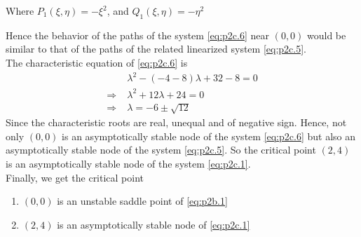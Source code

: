 \documentclass[../main-sheet.tex]{subfiles}
\begin{document}
\begin{soln}[c]
\begin{enumerate}[label=(\roman*)]
        Where \(P_1(\xi,\eta)=-\xi^2\), and \(Q_1(\xi,\eta)=-\eta^2\)
    \end{enumerate}
    Hence the behavior of the paths of the system \eqref{eq:p2c.6} near \((0,0)\) would be similar to that of the paths of the related linearized system \eqref{eq:p2c.5}.\\
    The characteristic equation of \eqref{eq:p2c.6} is
    \begin{align*}
        &\lambda^2-(-4-8)\lambda+32-8=0\\
        \Rightarrow\;&\lambda^2+12\lambda+24=0\\
        \Rightarrow\;&\lambda=-6\pm\sqrt{12}
    \end{align*}
    Since the characteristic roots are real, unequal and of negative sign. Hence, not only \((0,0)\) is an asymptotically stable node of the system \eqref{eq:p2c.6} but also an asymptotically stable node of the system \eqref{eq:p2c.5}. So the critical
    point \((2,4)\) is an asymptotically stable node of the system \eqref{eq:p2c.1}.\\


    Finally, we get the critical point 
    \begin{enumerate}[label=(\roman*)]
        \item \((0,0)\) is an unstable saddle point of \eqref{eq:p2b.1}
        \item \((2,4)\) is an asymptotically stable node of \eqref{eq:p2c.1}
    \end{enumerate}


\end{soln}
\end{document}
